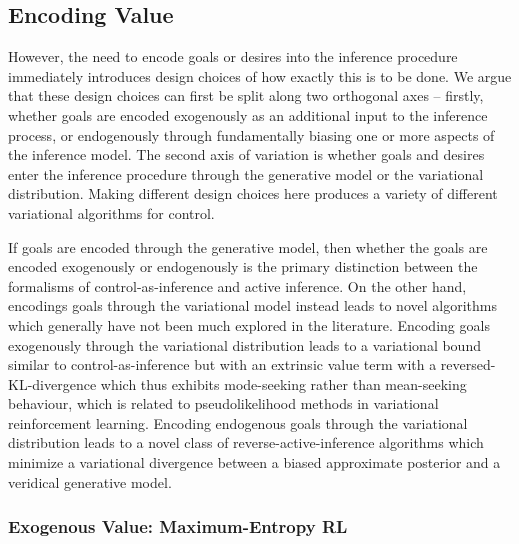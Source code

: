 \subsection{Encoding Value}

However, the need to encode goals or desires into the inference procedure immediately introduces design choices of how exactly this is to be done. We argue that these design choices can first be split along two orthogonal axes -- firstly, whether goals are encoded exogenously as an additional input to the inference process, or endogenously through fundamentally biasing one or more aspects of the inference model. The second axis of variation is whether goals and desires enter the inference procedure through the generative model or the variational distribution. Making different design choices here produces a variety of different variational algorithms for control.


If goals are encoded through the generative model, then whether the goals are encoded exogenously or endogenously is the primary distinction between the formalisms of control-as-inference and active inference. On the other hand, encodings goals through the variational model instead leads to novel algorithms which generally have not been much explored in the literature. Encoding goals exogenously through the variational distribution leads to a variational bound similar to control-as-inference but with an extrinsic value term with a reversed-KL-divergence which thus exhibits mode-seeking rather than mean-seeking behaviour, which is related to pseudolikelihood methods \citep{peters2007reinforcement} in variational reinforcement learning. Encoding endogenous goals through the variational distribution leads to a novel class of reverse-active-inference algorithms which minimize a variational divergence between a biased approximate posterior and a veridical generative model. %

\subsubsection{Exogenous Value: Maximum-Entropy RL}


